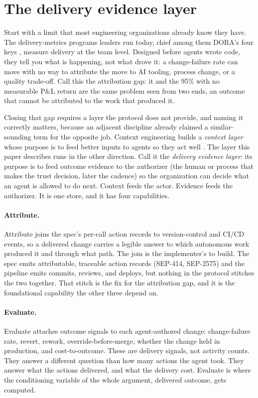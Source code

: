 \section{The delivery evidence layer}

Start with a limit that most engineering organizations already know they have.
The delivery-metrics programs leaders run today, chief among them DORA's four
keys \citep{dora2025}, measure delivery at the team level. Designed before agents
wrote code, they tell you what is happening, not what drove it: a change-failure
rate can move with no way to attribute the move to AI tooling, process change, or
a quality trade-off. Call this the attribution gap: it and the 95\% with no
measurable P\&L return are the same problem seen from two ends, an outcome that
cannot be attributed to the work that produced it.

Closing that gap requires a layer the protocol does not provide, and naming it
correctly matters, because an adjacent discipline already claimed a
similar-sounding term for the opposite job. Context engineering builds a
\emph{context layer} whose purpose is to feed better inputs to agents so they act
well \citep{ibmcontext}. The layer this paper describes runs in the other
direction. Call it the \emph{delivery evidence layer}: its purpose is to feed
outcome evidence to the authorizer (the human or process that makes the trust
decision, later the cadence) so the organization can decide what an agent
is allowed to do next. Context feeds the actor. Evidence feeds the authorizer.
It is one store, and it has four capabilities.

\paragraph{Attribute.} Attribute joins the spec's per-call action records to
version-control and CI/CD events, so a delivered change carries a legible answer
to which autonomous work produced it and through what path. The join is the
implementer's to build. The spec emits attributable, traceable action records
(SEP-414, SEP-2575) and the pipeline emits commits, reviews, and deploys, but
nothing in the protocol stitches the two together. That stitch is the fix for the
attribution gap, and it is the foundational capability the other three depend on.

\paragraph{Evaluate.} Evaluate attaches outcome signals to each agent-authored
change: change-failure rate, revert, rework, override-before-merge, whether the
change held in production, and cost-to-outcome. These are delivery signals, not
activity counts. They answer a different question than how many actions the agent
took. They answer what the actions delivered, and what the delivery cost.
Evaluate is where the conditioning variable of the whole argument, delivered
outcome, gets computed.

